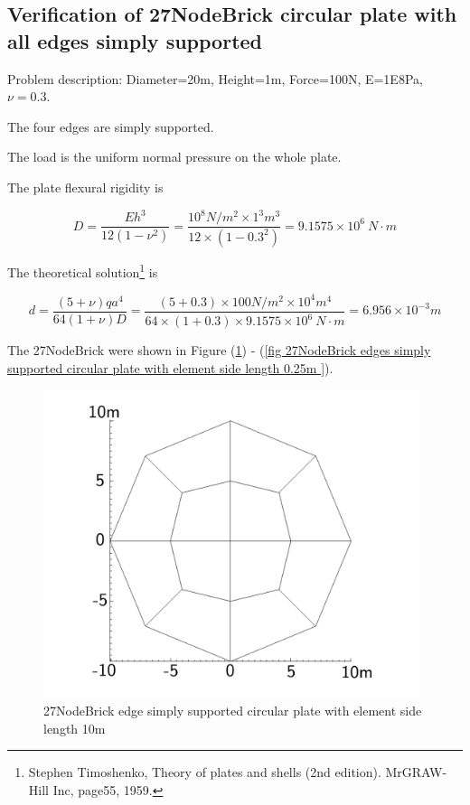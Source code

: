 \documentclass[fleqn,11pt]{article}
\begin{document}
\newpage
\subsection{Verification of 27NodeBrick circular plate with all edges simply supported}


Problem description: Diameter=20m, Height=1m, Force=100N, E=1E8Pa, $\nu=0.3$. 

The four edges are simply supported. 

The load is the uniform normal pressure on the whole plate. 


The plate flexural rigidity is 

\begin{equation}
  D=\frac{Eh^3}{12(1-\nu^2)}=\frac{10^8 N/m^2 \times 1^3 m^3 }{12 \times (1-0.3^2) }= 9.1575 \times 10^6 \ N\cdot m
\end{equation}

The theoretical solution\footnote{Stephen Timoshenko, Theory of plates and shells (2nd edition). MrGRAW-Hill Inc, page55, 1959.} is 

\begin{equation}
  d= \frac{(5+\nu)  q a^4}{64(1+\nu) D}=\frac{(5+0.3)\times 100 N/m^2 \times 10^4 m^4}{64\times(1+0.3) \times 9.1575 \times 10^6 \ N\cdot m}=6.956\times 10^{-3} m
\end{equation}



The 27NodeBrick were shown in Figure (\ref{fig 27NodeBrick edges simply supported circular plate with element side length 10m }) - (\ref{fig 27NodeBrick edges simply supported circular plate with element side length 0.25m }). 



\begin{figure}[H]
  \centering
  \includegraphics[width=11cm]{../Figure-files/circular_plate1.pdf}
  \caption{27NodeBrick edge simply supported circular plate with element side length 10m }
  \label{fig 27NodeBrick edges simply supported circular plate with element side length 10m }
\end{figure}
\end{document}
